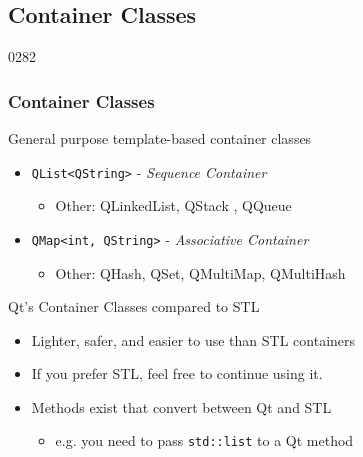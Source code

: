%
%
%
%

\subsection{Container Classes}


\begin{slide}{0282}\frametitle{Container Classes}
  General purpose template-based container classes
  \begin{itemize}
  \item \lstinline!QList<QString>! - \textit{Sequence Container}
    \begin{itemize}
    \item Other: QLinkedList, QStack , QQueue
    \end{itemize}
  \item \lstinline!QMap<int, QString>! - \textit{Associative Container}
    \begin{itemize}
    \item Other: QHash, QSet, QMultiMap, QMultiHash
    \end{itemize}
  \end{itemize}
  \medskip  Qt's Container Classes compared to STL
  \begin{itemize}
  \item Lighter, safer, and easier to use than STL containers
  \item If you prefer STL, feel free to continue using it.
  \item Methods exist that convert between Qt and STL
    \begin{itemize}
    \item e.g. you need to pass \texttt{std::list} to a Qt method
    \end{itemize}
  \end{itemize}
\end{slide}

